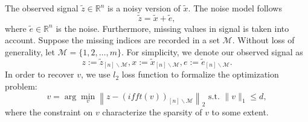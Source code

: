 \documentclass[final,onefignum,onetabnum]{siamart190516}
\begin{document}
The observed signal $\widetilde{z}\in \mathbb{R}^n$ is a noisy version of $\widetilde{x}$. The noise model follows
\begin{equation}
    \widetilde{z} = \widetilde{x} + \widetilde{e},
\end{equation}
where $\widetilde{e}\in\mathbb{R}^n$ is the noise. Furthermore, missing values in signal is taken into account. Suppose the missing indices are recorded in a set $\mathcal{M}$. Without loss of generality, let $\mathcal{M} = \{1,2,\dots,m\}$. For simplicity, we denote our observed signal as
\begin{equation}
    z:=\widetilde{z}_{[n]\backslash\mathcal{M}}, x:=\widetilde{x}_{[n]\backslash\mathcal{M}},
    e:=\widetilde{e}_{[n]\backslash\mathcal{M}}.
\end{equation}
In order to recover $v$, we use $l_2$ loss function to formalize the optimization problem:
\begin{equation}\label{complexopt}
    v = \arg\min_{v}\left\|z - \left(ifft(v)\right)_{[n]\backslash\mathcal{M}}\right\|_2 \text{ s.t. }\|v\|_1 \leq d,
\end{equation}
where the constraint on $v$ characterize the sparsity of $v$ to some extent.
\end{document}
